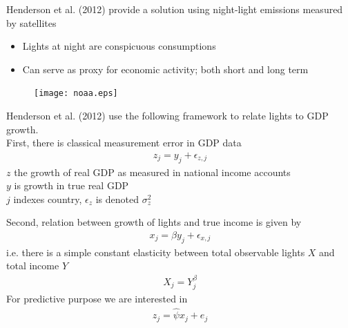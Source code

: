 \documentclass{beamer}
\begin{document}
\begin{frame}
  Henderson et al. (2012) provide a solution using night-light emissions measured by satellites
  \begin{itemize}
    \item Lights at night are conspicuous consumptions
    \item Can serve as proxy for economic activity; both short and long term
  \end{itemize}
\end{frame}

\begin{frame}
  \begin{figure}
    \texttt{[image: noaa.eps]}
  \end{figure}
\end{frame}

\begin{frame}
  Henderson et al. (2012) use the following framework to relate lights to GDP growth.\\
  First, there is classical measurement error in GDP data
  \begin{align}
    z_j= y_j+\epsilon_{z,j}
  \end{align}
  $z$ the growth of real GDP as measured in national income accounts\\
  $y$ is growth in true real GDP\\
  $j$ indexes country, $\epsilon_z$ is denoted $\sigma^2_z$
\end{frame}

\begin{frame}
  Second, relation between growth of lights and true income is given by
  \begin{align}
    x_j=\beta y_j + \epsilon_{x,j}
  \end{align}
  \medskip
  i.e. there is a simple constant elasticity between total observable lights $X$ and total income $Y$
  \begin{align}
    X_j=Y_j^{\beta}
  \end{align}
  \medskip
  For predictive purpose we are interested in
  \begin{align}
    z_j=\hat{\psi} x_j + e_j
  \end{align}
\end{frame}
\end{document}
